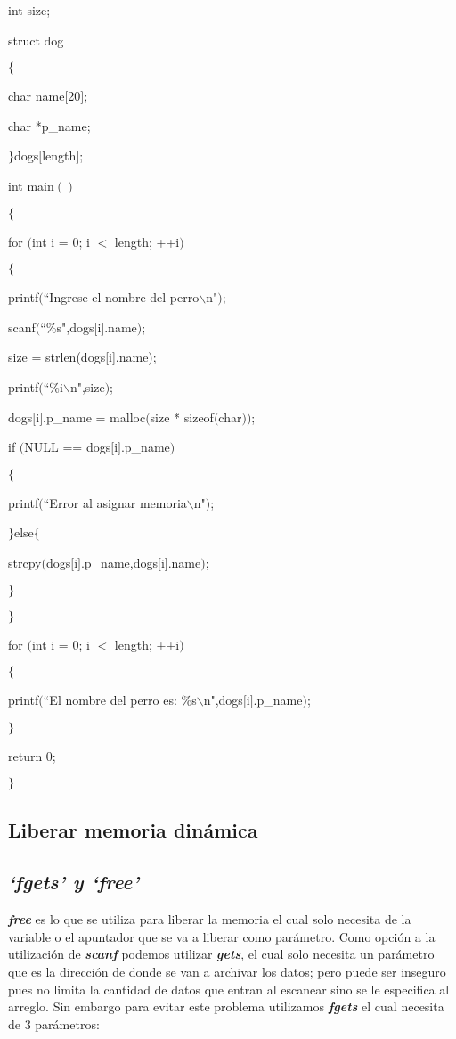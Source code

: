 \documentclass[]{article}
\begin{document}
	int size;
	
	struct dog
	
	$\lbrace$
	
	char name$[$20$]$;
	
	char *p\_name;
	
	$\rbrace$dogs$[$length$]$;
	
	int main$()$
	
	$\lbrace$
	
	for $($int i = 0; i $<$ length; ++i$)$
	
	$\lbrace$
	
	printf$($``Ingrese el nombre del perro$\backslash$n"$)$;
	
	scanf$($``\%s",dogs$[$i$]$.name$)$;
	
	size = strlen(dogs[i].name);
	
	printf$($``\%i$\backslash$n",size$)$;
	
	dogs$[$i$]$.p\_name = malloc$($size * sizeof$($char$))$;
	
	if $($NULL == dogs$[$i$]$.p\_name$)$
	
	$\lbrace$
	
	printf$($``Error al asignar memoria$\backslash$n"$)$;
	
	$\rbrace$else$\lbrace$
	
	strcpy$($dogs$[$i$]$.p\_name,dogs$[$i$]$.name$)$;
	
	$\rbrace$
	
	$\rbrace$
	
	for $($int i = 0; i $<$ length; ++i$)$
	
	$\lbrace$
	
	printf$($``El nombre del perro es: \%s$\backslash$n",dogs$[$i$]$.p\_name$)$;
	
	$\rbrace$
	
	return 0;
	
	$\rbrace$
	
	\subsection{Liberar memoria dinámica}
	
	\subsection{\textit{`fgets' y `free'}}
	
	\textit{\textbf{free}} es lo que se utiliza para liberar la memoria el cual solo necesita de la variable o el apuntador que se va a liberar como parámetro. Como opción a la utilización de \textit{\textbf{scanf}} podemos utilizar \textit{\textbf{gets}}, el cual solo necesita un parámetro que es la dirección de donde se van a archivar los datos; pero puede ser inseguro pues no limita la cantidad de datos que entran al escanear sino se le especifica al arreglo. Sin embargo para evitar este problema utilizamos \textit{\textbf{fgets}} el cual necesita de 3 parámetros:\\
	
\end{document}
